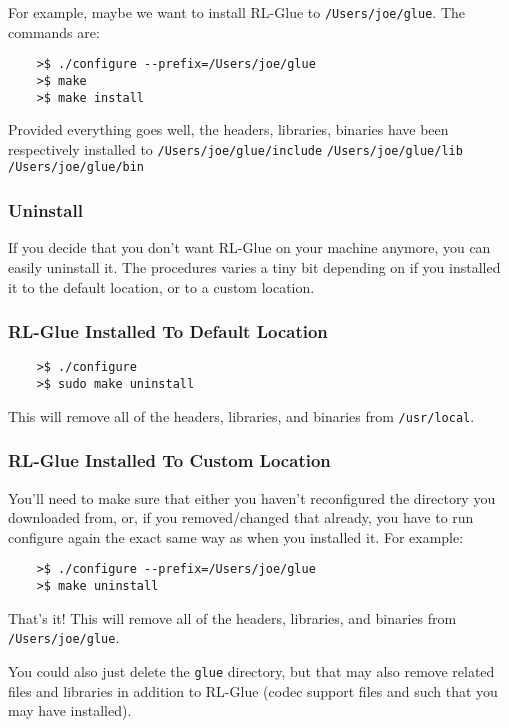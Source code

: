\documentclass[11pt]{article}
\begin{document}
For example, maybe we want to install RL-Glue to \texttt{/Users/joe/glue}.  The commands are:
\begin{verbatim}
	>$ ./configure --prefix=/Users/joe/glue
	>$ make
	>$ make install
\end{verbatim}

Provided everything goes well, the headers, libraries, binaries have been respectively installed to\newline
\texttt{/Users/joe/glue/include}\newline
\texttt{/Users/joe/glue/lib}\newline
\texttt{/Users/joe/glue/bin}


\subsubsection{Uninstall}
If you decide that you don't want  RL-Glue on your machine anymore, you can easily uninstall it.  The procedures varies a tiny bit depending on if you installed it to the default location, or to a custom location.

\subsubsection{RL-Glue Installed To Default Location}
\begin{verbatim}
	>$ ./configure
	>$ sudo make uninstall
\end{verbatim}

This will remove all of the headers, libraries, and binaries from \texttt{/usr/local}.

\subsubsection{RL-Glue Installed To Custom Location}
You'll need to make sure that either you haven't reconfigured the directory you downloaded from, or, if you removed/changed that already, you have to run configure again the exact same way as when you installed it.  For example:
\begin{verbatim}
	>$ ./configure --prefix=/Users/joe/glue
	>$ make uninstall
\end{verbatim}

That's it!  This will remove all of the headers, libraries, and binaries from \texttt{/Users/joe/glue}.

You could also just delete the \texttt{glue} directory, but that may also remove related files and libraries in addition to RL-Glue (codec support files and such that you may have installed).
\end{document}
